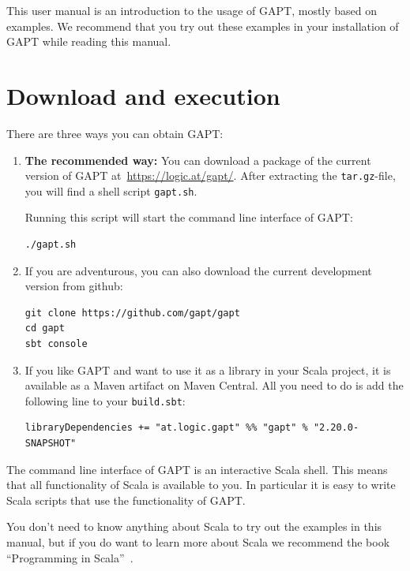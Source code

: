 \documentclass[a4paper,11pt]{book}
\begin{document}
This user manual is an introduction to the usage of GAPT, mostly based on examples.
We recommend that you try out these examples in your installation of GAPT while
reading this manual.

\chapter{Download and execution}

There are three ways you can obtain GAPT:

\begin{enumerate}

  \item {\bfseries The recommended way:}  You can download a package of the current
        version of GAPT at~\url{https://logic.at/gapt/}.  After extracting
        the \texttt{tar.gz}-file, you will find a shell script \texttt{gapt.sh}.

        Running this script will start the command line interface of GAPT:
        \begin{lstlisting}
./gapt.sh
\end{lstlisting}

  \item If you are adventurous, you can also download the current development
        version from github:
        \begin{lstlisting}
git clone https://github.com/gapt/gapt
cd gapt
sbt console
\end{lstlisting}

  \item If you like GAPT and want to use it as a library in your Scala project,
        it is available as a Maven artifact on Maven Central.  All you need to do is add
        the following line to your \verb,build.sbt,:
        \begin{lstlisting}
libraryDependencies += "at.logic.gapt" %% "gapt" % "2.20.0-SNAPSHOT"
\end{lstlisting}

\end{enumerate}

The command line interface of GAPT is an interactive Scala shell.  This means
that all functionality of Scala is available to you.  In particular it is easy
to write Scala scripts that use the functionality of GAPT.

You don't need to know anything about Scala to try out the examples in this
manual, but if you do want to learn more about Scala we recommend the book
``Programming in Scala''~\cite{odersky2008programming}.
\end{document}
